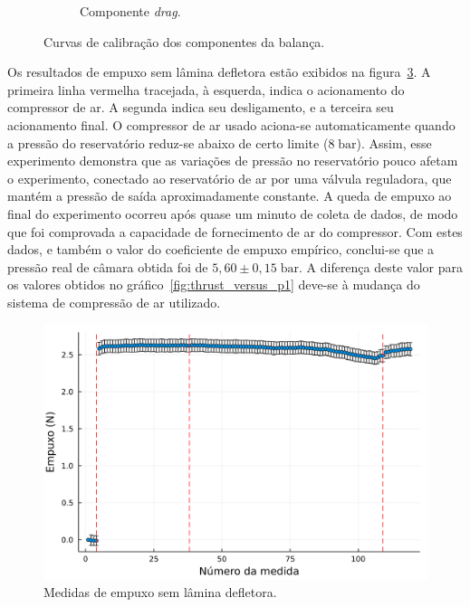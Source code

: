 \begin{figure}[htbp]
\begin{subfigure}{\textwidth}
        \caption{Componente \textit{drag}.}\label{fig:calibration_FD}
    \end{subfigure}
    \caption{Curvas de calibração dos componentes da balança.}\label{fig:calibration_curves}
\end{figure}

Os resultados de empuxo sem lâmina defletora estão exibidos na figura~\ref{fig:thrust_no_deflector}. A primeira linha vermelha tracejada, à esquerda, indica o acionamento do compressor de ar. A segunda indica seu desligamento, e a terceira seu acionamento final. O compressor de ar usado aciona-se automaticamente quando a pressão do reservatório reduz-se abaixo de certo limite (\(8\;\mathrm{bar}\)). Assim, esse experimento demonstra que as variações de pressão no reservatório pouco afetam o experimento, conectado ao reservatório de ar por uma válvula reguladora, que mantém a pressão de saída aproximadamente constante. A queda de empuxo ao final do experimento ocorreu após quase um minuto de coleta de dados, de modo que foi comprovada a capacidade de fornecimento de ar do compressor. Com estes dados, e também o valor do coeficiente de empuxo empírico, conclui-se que a pressão real de câmara obtida foi de \(5,60\pm 0,15\;\mathrm{bar}\). A diferença deste valor para os valores obtidos no gráfico~\ref{fig:thrust_versus_p1} deve-se à mudança do sistema de compressão de ar utilizado.

\begin{figure}[htbp]
    \centering
    \includegraphics[width=\textwidth]{img/results/thrust_no_deflector.png}
    \caption{Medidas de empuxo sem lâmina defletora.}\label{fig:thrust_no_deflector}
\end{figure}

